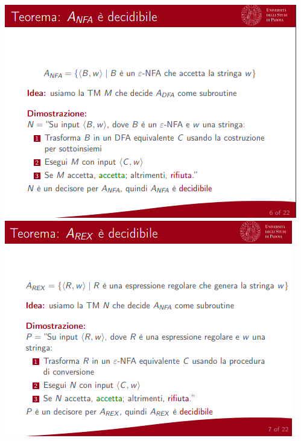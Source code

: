 \documentclass[]{article}
\begin{document}
\begin{center}
				\includegraphics[scale=0.8]{problemaRegolare3.png}
				\includegraphics[scale=0.8]{problemaRegolare4.png}

\end{center}
\end{document}
